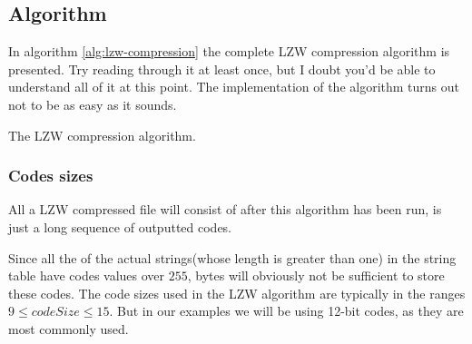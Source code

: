 \begin{refsection}
\subsection{Algorithm}
\label{sec:lzw-enc-algorithm}

In algorithm \ref{alg:lzw-compression} the complete LZW compression
algorithm is presented. Try reading through it at least once,
but I doubt you'd be able to understand all of it at this point. The
implementation of the algorithm turns out not to be as easy as it
sounds.

\begin{algorithm}[H]
  \caption{The LZW compression algorithm.}
  \label{alg:lzw-compression}
  \begin{algorithmic}[1]

    \While{\neof}

       \label{algl:hasingcheckintable}
         \label{algl:hasgetcode}
      \Else
        \State {}


          \State {}\label{algl:hashadd}

        \EndIf


      \EndIf


    \EndWhile

    \State {}
    \State {}

  \end{algorithmic}
\end{algorithm}

\subsubsection{Codes sizes}

All a LZW compressed file will consist of after this algorithm has
been run, is just a long sequence of outputted codes.

Since all the of the actual strings(whose length is greater than one)
in the string table have codes values over $255$, bytes will obviously
not be sufficient to store these codes. The code sizes used in the LZW algorithm are typically in the ranges $9 \leq
codeSize \leq 15$. But in our examples we will be using 12-bit codes,
as they are most commonly used.


\end{refsection}
